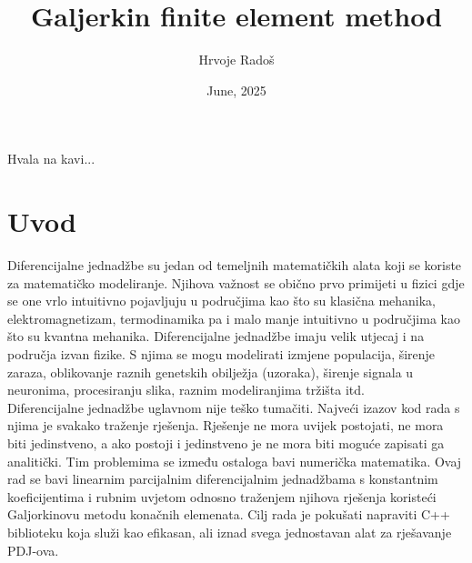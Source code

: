 \documentclass[zavrsnirad]{../fer}
\title{Galjerkin finite element method}
\author{Hrvoje Radoš}
\date{June, 2025}
\begin{document}
\maketitle






\begin{zahvale}
	Hvala na kavi...
\end{zahvale}


\mainmatter


{\large
\tableofcontents
}

\chapter{Uvod}
\label{pog:uvod}
Diferencijalne jednadžbe su jedan od temeljnih matematičkih
alata koji se koriste za matematičko modeliranje. Njihova
važnost se obično prvo primijeti u fizici gdje se one vrlo
intuitivno pojavljuju u područjima kao što su klasična mehanika,
elektromagnetizam, termodinamika pa i malo manje intuitivno u
područjima kao što su kvantna mehanika. Diferencijalne jednadžbe
imaju velik utjecaj i na područja izvan fizike.
S njima se mogu modelirati izmjene populacija, širenje zaraza,
oblikovanje raznih genetskih obilježja (uzoraka),
širenje signala u neuronima, procesiranju slika, raznim
modeliranjima tržišta itd.
\bigskip
\\
Diferencijalne jednadžbe uglavnom nije teško tumačiti. Najveći
izazov kod rada s njima je svakako traženje rješenja.
Rješenje ne mora uvijek postojati, ne mora biti jedinstveno,
a ako postoji i jedinstveno je ne mora biti moguće zapisati
ga analitički. Tim problemima se između ostaloga bavi numerička
matematika. Ovaj rad se bavi linearnim parcijalnim diferencijalnim
jednadžbama s konstantnim koeficijentima i rubnim uvjetom odnosno
traženjem njihova rješenja koristeći Galjorkinovu metodu
konačnih elemenata. Cilj rada je pokušati  napraviti
C++ biblioteku koja služi kao efikasan, ali iznad svega
jednostavan alat za rješavanje PDJ-ova. 
\newpage
\end{document}
